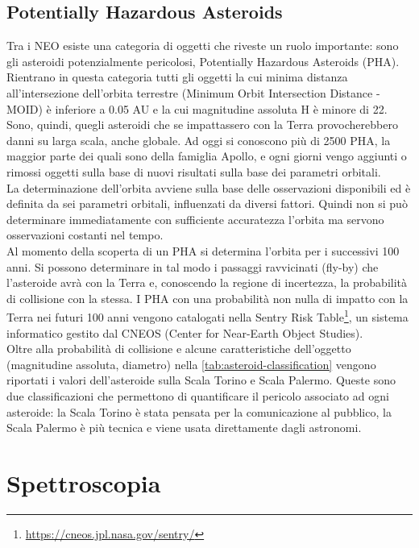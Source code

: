 \documentclass[a4paper,11pt,openright]{book}
\begin{document}
\section{Potentially Hazardous Asteroids}
Tra i NEO esiste una categoria di oggetti che riveste un ruolo importante: sono gli asteroidi potenzialmente pericolosi, Potentially Hazardous Asteroids (PHA). Rientrano in questa categoria tutti gli oggetti la cui minima distanza all'intersezione dell'orbita terrestre (Minimum Orbit Intersection Distance - MOID) è inferiore a 0.05 AU e la cui magnitudine assoluta H è minore di 22. Sono, quindi, quegli asteroidi che se impattassero con la Terra provocherebbero danni su larga scala, anche globale. Ad oggi si conoscono più di 2500 PHA, la maggior parte dei quali sono della famiglia Apollo, e ogni giorni vengo aggiunti o rimossi oggetti sulla base di nuovi risultati sulla base dei parametri orbitali.\\
La determinazione dell'orbita avviene sulla base delle osservazioni disponibili ed è definita da sei parametri orbitali, influenzati da diversi fattori. Quindi non si può determinare immediatamente con sufficiente accuratezza l'orbita ma servono osservazioni costanti nel tempo.\\
Al momento della scoperta di un PHA si determina l'orbita per i successivi 100 anni. Si possono determinare in tal modo i passaggi ravvicinati (fly-by) che l'asteroide avrà con la Terra e, conoscendo la regione di incertezza, la probabilità di collisione con la stessa.
I PHA con una probabilità non nulla di impatto con la Terra nei futuri 100 anni vengono catalogati nella Sentry Risk Table\footnote{\href {https://cneos.jpl.nasa.gov/sentry/}{https://cneos.jpl.nasa.gov/sentry/} }, un sistema informatico gestito dal CNEOS (Center for Near-Earth Object Studies).\\
Oltre alla probabilità di collisione e alcune caratteristiche dell’oggetto (magnitudine assoluta, diametro) nella \cref{tab:asteroid-classification} vengono riportati i valori dell’asteroide sulla Scala Torino e Scala Palermo. Queste sono due classificazioni che permettono di quantificare il pericolo associato ad ogni asteroide: la Scala Torino è stata pensata per la comunicazione al pubblico, la Scala Palermo è più tecnica e viene usata direttamente dagli astronomi.

\chapter{Spettroscopia}
\end{document}
